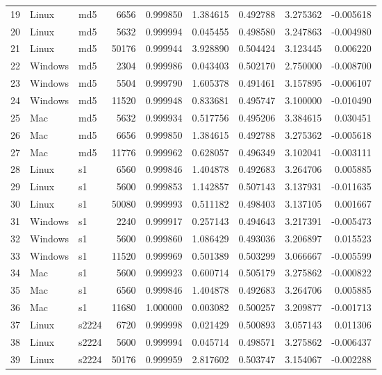 \documentclass{IEEEtran}
\begin{document}
\begin{longtable}{rllrrrrrr}
  19 & Linux & md5 &    6656 & 0.999850 & 1.384615 & 0.492788 & 3.275362 & -0.005618 \\ 
  20 & Linux & md5 &    5632 & 0.999994 & 0.045455 & 0.498580 & 3.247863 & -0.004980 \\ 
  21 & Linux & md5 &   50176 & 0.999944 & 3.928890 & 0.504424 & 3.123445 & 0.006220 \\ 
  22 & Windows & md5 &    2304 & 0.999986 & 0.043403 & 0.502170 & 2.750000 & -0.008700 \\ 
  23 & Windows & md5 &    5504 & 0.999790 & 1.605378 & 0.491461 & 3.157895 & -0.006107 \\ 
  24 & Windows & md5 &   11520 & 0.999948 & 0.833681 & 0.495747 & 3.100000 & -0.010490 \\ 
  25 & Mac & md5 &    5632 & 0.999934 & 0.517756 & 0.495206 & 3.384615 & 0.030451 \\ 
  26 & Mac & md5 &    6656 & 0.999850 & 1.384615 & 0.492788 & 3.275362 & -0.005618 \\ 
  27 & Mac & md5 &   11776 & 0.999962 & 0.628057 & 0.496349 & 3.102041 & -0.003111 \\ 
  28 & Linux & s1 &    6560 & 0.999846 & 1.404878 & 0.492683 & 3.264706 & 0.005885 \\ 
  29 & Linux & s1 &    5600 & 0.999853 & 1.142857 & 0.507143 & 3.137931 & -0.011635 \\ 
  30 & Linux & s1 &   50080 & 0.999993 & 0.511182 & 0.498403 & 3.137105 & 0.001667 \\ 
  31 & Windows & s1 &    2240 & 0.999917 & 0.257143 & 0.494643 & 3.217391 & -0.005473 \\ 
  32 & Windows & s1 &    5600 & 0.999860 & 1.086429 & 0.493036 & 3.206897 & 0.015523 \\ 
  33 & Windows & s1 &   11520 & 0.999969 & 0.501389 & 0.503299 & 3.066667 & -0.005599 \\ 
  34 & Mac & s1 &    5600 & 0.999923 & 0.600714 & 0.505179 & 3.275862 & -0.000822 \\ 
  35 & Mac & s1 &    6560 & 0.999846 & 1.404878 & 0.492683 & 3.264706 & 0.005885 \\ 
  36 & Mac & s1 &   11680 & 1.000000 & 0.003082 & 0.500257 & 3.209877 & -0.001713 \\ 
  37 & Linux & s2224 &    6720 & 0.999998 & 0.021429 & 0.500893 & 3.057143 & 0.011306 \\ 
  38 & Linux & s2224 &    5600 & 0.999994 & 0.045714 & 0.498571 & 3.275862 & -0.006437 \\ 
  39 & Linux & s2224 &   50176 & 0.999959 & 2.817602 & 0.503747 & 3.154067 & -0.002288 \\ 

\end{longtable}
\end{document}
